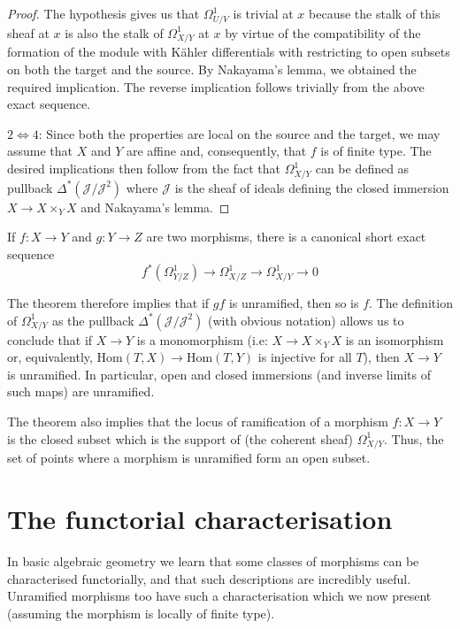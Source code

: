 \begin{proof}
\medskip\noindent
The hypothesis gives us that $\Omega^1_{U/V}$ is trivial at $x$ because the
stalk of this sheaf at $x$ is also the stalk of $\Omega^1_{X/Y}$ at $x$ by
virtue of the compatibility of the formation of the module with K\"ahler
differentials with restricting to open subsets on both the target and the
source. By Nakayama's lemma, we obtained the required implication. The reverse
implication follows trivially from the above exact sequence.

\medskip\noindent
$2 \Longleftrightarrow 4$: Since both the properties are local on the source
and the target, we may assume that $X$ and $Y$ are affine and, consequently,
that $f$ is of finite type. The desired implications then follow from the fact
that $\Omega^1_{X/Y}$ can be defined as pullback 
$\Delta^*(\mathcal{J}/\mathcal{J}^2)$ where
$\mathcal{J}$ is the sheaf of ideals defining the closed immersion $X \to X 
\times_Y X$
and Nakayama's lemma.
\end{proof}

\noindent
If $f:X \to Y$ and $g:Y \to Z$ are two morphisms, there is a canonical short
exact sequence
$$
f^*(\Omega^1_{Y/Z}) \to \Omega^1_{X/Z} \to \Omega^1_{X/Y} \to 0
$$

\medskip\noindent
The theorem therefore implies that if $gf$ is unramified, then so is $f$. The
definition of $\Omega^1_{X/Y}$ as the pullback  
$\Delta^*(\mathcal{J}/\mathcal{J}^2)$ (with
obvious notation) allows us to conclude that if $X \to Y$ is a monomorphism
(i.e: $X \to X \times_Y X$ is an isomorphism or, equivalently,
$\text{Hom}(T,X) \to \text{Hom}(T,Y)$ is injective for all $T$), then $X \to Y$ 
is
unramified. In particular, open and closed immersions (and inverse limits of
such maps) are unramified.

\medskip\noindent
The theorem also implies that the locus of ramification of a morphism
$f:X \to Y$ is the closed subset which is the support of (the coherent sheaf)
$\Omega^1_{X/Y}$. Thus, the set of points where a morphism is unramified form
an open subset.

\section{The functorial characterisation}
\label{section-functorial-unramified}

\noindent
In basic algebraic geometry we learn that some classes of morphisms can be
characterised functorially, and that such descriptions are incredibly useful.
Unramified morphisms too have such a characterisation which we now present
(assuming the morphism is locally of finite type).

